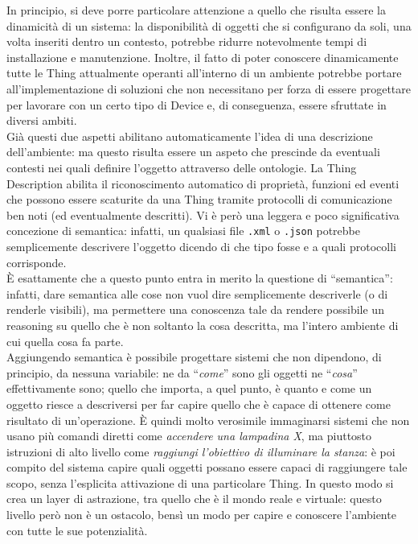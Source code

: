 \documentclass[12pt,a4paper,openright,oneside]{report}
\newcommand{\quotes}[1]{``#1''}
\begin{document}
In principio, si deve porre particolare attenzione a quello che risulta essere la dinamicità di un sistema: la disponibilità di oggetti che si configurano da soli, una volta inseriti dentro un contesto, potrebbe ridurre notevolmente tempi di installazione e manutenzione. Inoltre, il fatto di poter conoscere dinamicamente tutte le Thing attualmente operanti all'interno di un ambiente potrebbe portare all'implementazione di soluzioni che non necessitano per forza di essere progettare per lavorare con un certo tipo di Device e, di conseguenza, essere sfruttate in diversi ambiti.\\

Già questi due aspetti abilitano automaticamente l'idea di una descrizione dell'ambiente: ma questo risulta essere un aspeto che prescinde da eventuali contesti nei quali definire l'oggetto attraverso delle ontologie. La Thing Description abilita il riconoscimento automatico di proprietà, funzioni ed eventi che possono essere scaturite da una Thing tramite protocolli di comunicazione ben noti (ed eventualmente descritti). Vi è però una leggera e poco significativa concezione di semantica: infatti, un qualsiasi file \texttt{.xml} o \texttt{.json} potrebbe semplicemente descrivere l'oggetto dicendo di che tipo fosse e a quali protocolli corrisponde.\\

È esattamente che a questo punto entra in merito la questione di \quotes{semantica}: infatti, dare semantica alle cose non vuol dire semplicemente descriverle (o di renderle visibili), ma permettere una conoscenza tale da rendere possibile un reasoning su quello che è non soltanto la cosa descritta, ma l'intero ambiente di cui quella cosa fa parte.\\

Aggiungendo semantica è possibile progettare sistemi che non dipendono, di principio, da nessuna variabile: ne da \quotes{\textit{come}} sono gli oggetti ne \quotes{\textit{cosa}} effettivamente sono; quello che importa, a quel punto, è quanto e come un oggetto riesce a descriversi per far capire quello che è capace di ottenere come risultato di un'operazione. È quindi molto verosimile immaginarsi sistemi che non usano più comandi diretti come \textit{accendere una lampadina X}, ma piuttosto istruzioni di alto livello come \textit{raggiungi l'obiettivo di illuminare la stanza}: è poi compito del sistema capire quali oggetti possano essere capaci di raggiungere tale scopo, senza l'esplicita attivazione di una particolare Thing. In questo modo si crea un layer di astrazione, tra quello che è il mondo reale e virtuale: questo livello però non è un ostacolo, bensì un modo per capire e conoscere l'ambiente con tutte le sue potenzialità.\\
\end{document}
